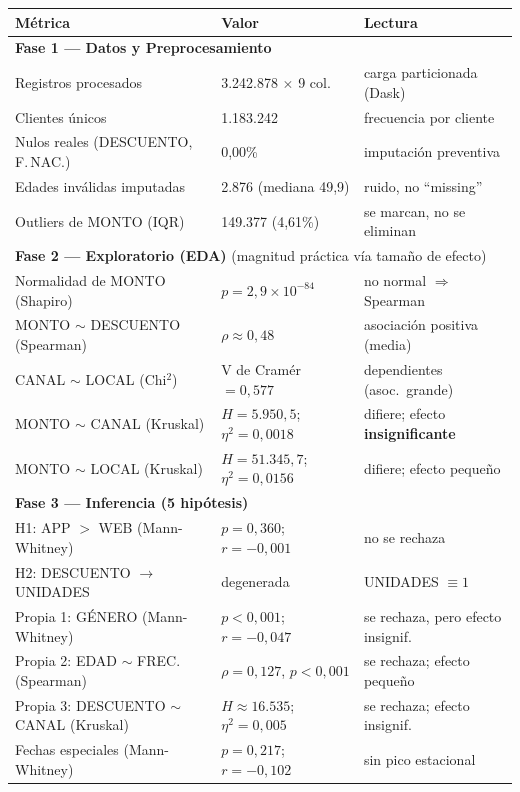 \documentclass[12pt,letterpaper]{article}
\begin{document}
\begin{table}[H]
\centering
\small
\renewcommand{\arraystretch}{1.15}
\begin{tabular}{p{5.6cm} p{4.3cm} p{4.0cm}}
\toprule
\textbf{Métrica} & \textbf{Valor} & \textbf{Lectura} \\
\midrule
\multicolumn{3}{l}{\textbf{Fase 1 --- Datos y Preprocesamiento}} \\
Registros procesados & 3.242.878 $\times$ 9 col. & carga particionada (Dask) \\
Clientes únicos & 1.183.242 & frecuencia por cliente \\
Nulos reales (DESCUENTO, F.\,NAC.) & 0,00\% & imputación preventiva \\
Edades inválidas imputadas & 2.876 (mediana 49,9) & ruido, no ``missing'' \\
Outliers de MONTO (IQR) & 149.377 (4,61\%) & se marcan, no se eliminan \\
\midrule
\multicolumn{3}{l}{\textbf{Fase 2 --- Exploratorio (EDA)} \; \footnotesize(magnitud práctica vía tamaño de efecto)} \\
Normalidad de MONTO (Shapiro) & $p = 2{,}9\times10^{-84}$ & no normal $\Rightarrow$ Spearman \\
MONTO $\sim$ DESCUENTO (Spearman) & $\rho \approx 0{,}48$ & asociación positiva (media) \\
CANAL $\sim$ LOCAL (Chi$^2$) & V de Cramér $=0{,}577$ & dependientes (asoc.\ grande) \\
MONTO $\sim$ CANAL (Kruskal) & $H=5.950{,}5$; $\eta^2=0{,}0018$ & difiere; efecto \textbf{insignificante} \\
MONTO $\sim$ LOCAL (Kruskal) & $H=51.345{,}7$; $\eta^2=0{,}0156$ & difiere; efecto pequeño \\
\midrule
\multicolumn{3}{l}{\textbf{Fase 3 --- Inferencia (5 hipótesis)}} \\
H1: APP $>$ WEB (Mann-Whitney) & $p=0{,}360$; $r=-0{,}001$ & no se rechaza \\
H2: DESCUENTO $\to$ UNIDADES & degenerada & UNIDADES $\equiv 1$ \\
Propia 1: GÉNERO (Mann-Whitney) & $p<0{,}001$; $r=-0{,}047$ & se rechaza, pero efecto insignif. \\
Propia 2: EDAD $\sim$ FREC. (Spearman) & $\rho=0{,}127$, $p<0{,}001$ & se rechaza; efecto pequeño \\
Propia 3: DESCUENTO $\sim$ CANAL (Kruskal) & $H\approx16.535$; $\eta^2=0{,}005$ & se rechaza; efecto insignif. \\
Fechas especiales (Mann-Whitney) & $p=0{,}217$; $r=-0{,}102$ & sin pico estacional \\

\end{tabular}
\end{table}
\end{document}

